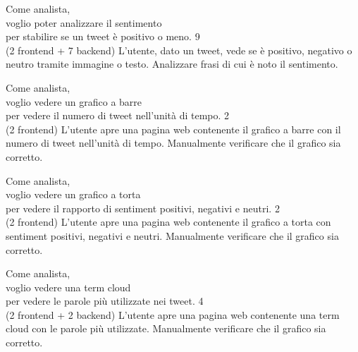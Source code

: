\userstory%
{Come analista,\\voglio poter analizzare il sentimento\\per stabilire se un tweet è positivo o meno.}%
{9\\(2 frontend + 7 backend)}%
{L'utente, dato un tweet, vede se è positivo, negativo o neutro tramite immagine o testo.}%
{Analizzare frasi di cui è noto il sentimento.}

\userstory%
{Come analista,\\voglio vedere un grafico a barre\\per vedere il numero di tweet nell'unità di tempo.}%
{2\\(2 frontend)}%
{L'utente apre una pagina web contenente il grafico a barre con il numero di tweet nell'unità di tempo.}%
{Manualmente verificare che il grafico sia corretto.}

\userstory%
{Come analista,\\voglio vedere un grafico a torta\\per vedere il rapporto di sentiment positivi, negativi e neutri.}%
{2\\(2 frontend)}%
{L'utente apre una pagina web contenente il grafico a torta con sentiment positivi, negativi e neutri.}%
{Manualmente verificare che il grafico sia corretto.}

\userstory%
{Come analista,\\voglio vedere una term cloud\\per vedere le parole più utilizzate nei tweet.}%
{4\\(2 frontend + 2 backend)}%
{L'utente apre una pagina web contenente una term cloud con le parole più utilizzate.}%
{Manualmente verificare che il grafico sia corretto.}

\newpage
